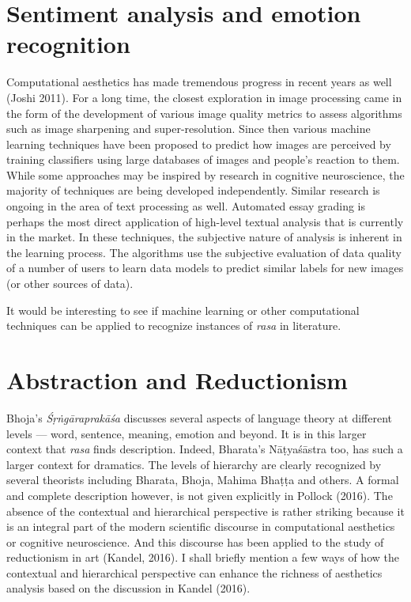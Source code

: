 \section*{Sentiment analysis and emotion recognition}

Computational aesthetics has made tremendous progress in recent years as well (Joshi 2011). For a long time, the closest exploration in image processing came in the form of the development of various image quality metrics to assess algorithms such as image sharpening and super-resolution. Since then various machine learning techniques have been proposed to predict how images are perceived by training classifiers using large databases of images and people’s reaction to them. While some approaches may be inspired by research in cognitive neuroscience, the majority of techniques are being developed independently. Similar research is ongoing in the area of text processing as well. Automated essay grading is perhaps the most direct application of high-level textual analysis that is currently in the market. In these techniques, the subjective nature of analysis is inherent in the learning process. The algorithms use the subjective evaluation of data quality of a number of users to learn data models to predict similar labels for new images (or other sources of data).

It would be interesting to see if machine learning or other computational techniques can be applied to recognize instances of \textsl{rasa} in literature.\\[-21pt]

\section*{Abstraction and Reductionism}

Bhoja’s \textsl{Śṛṅgāraprakāśa} discusses several aspects of language theory at different levels --- word, sentence, meaning, emotion and beyond. It is in this larger context that \textsl{rasa} finds description. Indeed, Bharata’s Nāṭyaśāstra too, has such a larger context for dramatics. The levels of hierarchy are clearly recognized by several theorists including Bharata, Bhoja, Mahima Bhaṭṭa and others. A formal and complete description however, is not given explicitly in Pollock (2016). The absence of the contextual and hierarchical perspective is rather striking because it is an integral part of the modern scientific discourse in computational aesthetics or cognitive neuroscience. And this discourse has been applied to the study of reductionism in art (Kandel, 2016). I shall briefly mention a few ways of how the contextual and hierarchical perspective can enhance the richness of aesthetics analysis based on the discussion in Kandel (2016).

